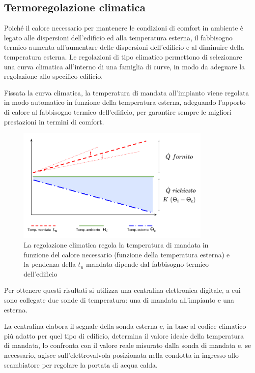 \documentclass[laurea,oneside,11pt]{USiena_tesiLM}
\begin{document}
\subsection{Termoregolazione climatica}
Poiché il calore necessario per mantenere le condizioni di comfort in ambiente è legato alle dispersioni dell'edificio ed alla temperatura esterna, il fabbisogno termico aumenta all'aumentare delle dispersioni dell'edificio e al diminuire della temperatura esterna. Le regolazioni di tipo climatico permettono di selezionare una curva climatica all'interno di una famiglia di curve, in modo da adeguare la regolazione allo specifico edificio. 

Fissata la curva climatica, la temperatura di mandata all'impianto viene regolata in modo automatico in funzione della temperatura esterna, adeguando l'apporto di calore al fabbisogno termico dell'edificio, per garantire sempre le migliori prestazioni in termini di comfort. 

\begin{figure}[!ht]
\centering
\includegraphics[width=0.85\textwidth]{figure/climatica} 
\caption{La regolazione climatica regola la temperatura di mandata in funzione del calore necessario (funzione della temperatura esterna) e la pendenza della $t_u$ mandata dipende dal fabbisogno termico dell'edificio}
\label{fig:surplus}
\end{figure}

Per ottenere questi risultati si utilizza una centralina elettronica digitale, a cui sono collegate due sonde di temperatura: una di mandata all'impianto e una esterna. 

La centralina elabora il segnale della sonda esterna e, in base al codice climatico più adatto per quel tipo di edificio, determina il valore ideale della temperatura di mandata, lo confronta con il valore reale misurato dalla sonda di mandata e, se necessario, agisce sull'elettrovalvola posizionata nella condotta in ingresso allo scambiatore per regolare la portata di acqua calda.
\end{document}
